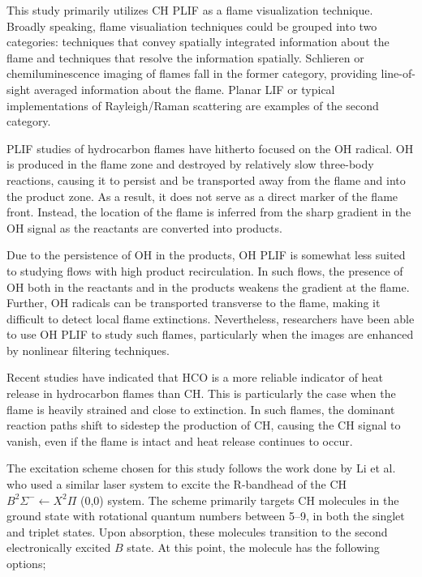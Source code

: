 This study primarily utilizes CH PLIF as a flame visualization technique.
Broadly speaking, flame visualiation techniques could be grouped into two categories: techniques that convey spatially integrated information about the flame and techniques that resolve the information spatially.
Schlieren or chemiluminescence imaging of flames fall in the former category, providing line-of-sight averaged information about the flame.
Planar LIF or typical implementations of Rayleigh/Raman scattering are examples of the second category.

PLIF studies of hydrocarbon flames have hitherto focused on the OH radical.
OH is produced in the flame zone and destroyed by relatively slow three-body reactions, causing it to persist and be transported away from the flame and into the product zone.\cite{1990-barlow}
As a result, it does not serve as a direct marker of the flame front.
Instead, the location of the flame is inferred from the sharp gradient in the OH signal as the reactants are converted into products.

Due to the persistence of OH in the products, OH PLIF is somewhat less suited to studying flows with high product recirculation.
In such flows, the presence of OH both in the reactants and in the products weakens the gradient at the flame.
Further, OH radicals can be transported transverse to the flame, making it difficult to detect local flame extinctions.
Nevertheless, researchers have been able to use OH PLIF to study such flames,\cite{1999-kaminski,2005-hult} particularly when the images are enhanced by nonlinear filtering techniques.\cite{2000-malm,2001-abu-gharbieh}

Recent studies have indicated that HCO is a more reliable indicator of heat release in hydrocarbon flames than CH.\cite{1998-najm}
This is particularly the case when the flame is heavily strained and close to extinction.
In such flames, the dominant reaction paths shift to sidestep the production of CH, causing the CH signal to vanish, even if the flame is intact and heat release continues to occur.



The excitation scheme chosen for this study follows the work done by Li et al.\cite{2007-li-a} who used a similar laser system to excite the R-bandhead of the CH \(B^2\Sigma^- \leftarrow X^2\Pi\) (0,0) system.
The scheme primarily targets CH molecules in the ground state with rotational quantum numbers between 5--9, in both the singlet and triplet states.
Upon absorption, these molecules transition to the second electronically excited \(B\) state.
At this point, the molecule has the following options;

